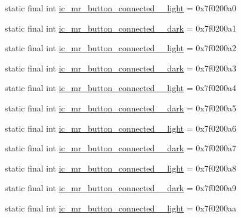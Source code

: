 \begin{CompactItemize}
\item 
static final int \hyperlink{classandroid_1_1support_1_1graphics_1_1drawable_1_1animated_1_1_r_1_1drawable_61b67ce4771886a324ea8d1dc7d6c5fe}{ic\_\-mr\_\-button\_\-connected\_\_\-light} = 0x7f0200a0
\item 
static final int \hyperlink{classandroid_1_1support_1_1graphics_1_1drawable_1_1animated_1_1_r_1_1drawable_3c97ca9eb861a04523bd80567525ff89}{ic\_\-mr\_\-button\_\-connected\_\_\-dark} = 0x7f0200a1
\item 
static final int \hyperlink{classandroid_1_1support_1_1graphics_1_1drawable_1_1animated_1_1_r_1_1drawable_87a274dd70033f004f2e71c8e990fcf4}{ic\_\-mr\_\-button\_\-connected\_\_\-light} = 0x7f0200a2
\item 
static final int \hyperlink{classandroid_1_1support_1_1graphics_1_1drawable_1_1animated_1_1_r_1_1drawable_5c22b5be3e8f96be45a33e4c3483c677}{ic\_\-mr\_\-button\_\-connected\_\_\-dark} = 0x7f0200a3
\item 
static final int \hyperlink{classandroid_1_1support_1_1graphics_1_1drawable_1_1animated_1_1_r_1_1drawable_3fdcf99ba5100165bc5231568bfdc742}{ic\_\-mr\_\-button\_\-connected\_\_\-light} = 0x7f0200a4
\item 
static final int \hyperlink{classandroid_1_1support_1_1graphics_1_1drawable_1_1animated_1_1_r_1_1drawable_34465746147ee5e26735ac6c651aa598}{ic\_\-mr\_\-button\_\-connected\_\_\-dark} = 0x7f0200a5
\item 
static final int \hyperlink{classandroid_1_1support_1_1graphics_1_1drawable_1_1animated_1_1_r_1_1drawable_1cfad46024e1a2621d650819b32d1339}{ic\_\-mr\_\-button\_\-connected\_\_\-light} = 0x7f0200a6
\item 
static final int \hyperlink{classandroid_1_1support_1_1graphics_1_1drawable_1_1animated_1_1_r_1_1drawable_278844cb24ab2d7c619f0f264ad47f65}{ic\_\-mr\_\-button\_\-connected\_\_\-dark} = 0x7f0200a7
\item 
static final int \hyperlink{classandroid_1_1support_1_1graphics_1_1drawable_1_1animated_1_1_r_1_1drawable_efead5ce276a8dda2402352f0c1bcb84}{ic\_\-mr\_\-button\_\-connected\_\_\-light} = 0x7f0200a8
\item 
static final int \hyperlink{classandroid_1_1support_1_1graphics_1_1drawable_1_1animated_1_1_r_1_1drawable_87345075c813ede958199cfe2947ed07}{ic\_\-mr\_\-button\_\-connected\_\_\-dark} = 0x7f0200a9
\item 
static final int \hyperlink{classandroid_1_1support_1_1graphics_1_1drawable_1_1animated_1_1_r_1_1drawable_f14e86e32fd95e956ce420bb496ffb42}{ic\_\-mr\_\-button\_\-connected\_\_\-light} = 0x7f0200aa

\end{CompactItemize}
